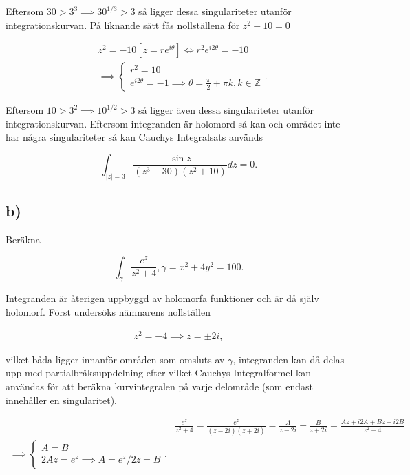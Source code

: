 \documentclass[a4paper]{article}
\begin{document}
Eftersom $30 > 3^3 \implies 30^{1/3} > 3$ så ligger dessa singulariteter utanför integrationskurvan. På liknande sätt fås nollställena för $z^2 + 10 = 0$ 

\begin{align*}
	&z^2 = -10 \left[z = re^{i\theta}\right] \iff r^2e^{i2\theta} = -10\\
	&\implies	\begin{cases}
					r^2 = 10\\
					e^{i2\theta} = -1 \implies \theta = \frac{\pi}{2} + \pi k, k \in \mathbb{Z}
				\end{cases}.
\end{align*}

Eftersom $10 > 3^2 \implies 10^{1/2} > 3$ så ligger även dessa singulariteter utanför integrationskurvan. Eftersom integranden är holomord så kan och området inte har några singulariteter så kan Cauchys Integralsats används

\begin{equation*}
	\int_{|z|=3}\frac{\sin z}{(z^3 - 30)(z^2 + 10)}dz = 0.
\end{equation*}

\subsection*{b)}

Beräkna

\begin{equation*}
	\int_\gamma \frac{e^z}{z^2 + 4}, \gamma = x^2 + 4y^2 = 100.
\end{equation*}

Integranden är återigen uppbyggd av holomorfa funktioner och är då själv holomorf. Först undersöks nämnarens nollställen

\begin{align*}
	z^2 = -4 \implies z = \pm 2i,
\end{align*}

vilket båda ligger innanför områden som omsluts av $\gamma$, integranden kan då delas upp med partialbråksuppdelning efter vilket Cauchys Integralformel kan användas för att beräkna kurvintegralen på varje delområde (som endast innehåller en singularitet).

\begin{align*}
	&\frac{e^z}{z^2 + 4} = \frac{e^z}{(z-2i)(z+2i)} = \frac{A}{z-2i} + \frac{B}{z+2i} = \frac{Az + i2A + Bz - i2B}{z^2 + 4}\\
	\implies	\begin{cases}
					A = B\\
					2Az = e^z \implies A = e^z/2z = B
				\end{cases}.
\end{align*}
\end{document}
